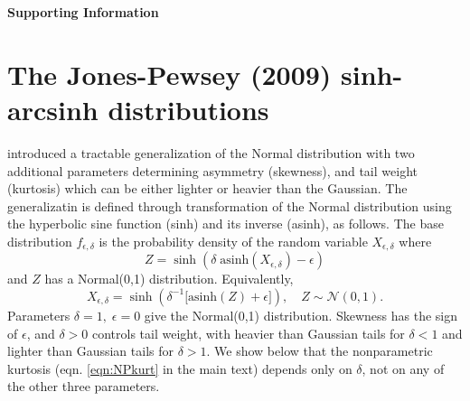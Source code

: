 \documentclass[12pt]{article}
\newcommand{\be}{\begin{equation}}
\newcommand{\ee}{\end{equation}}
\begin{document}
\newpage 
\clearpage 
\appendix

\renewcommand{\thetable}{S-\arabic{table}}
\renewcommand{\thefigure}{S-\arabic{figure}}
\renewcommand{\thesection}{S.\arabic{section}}
\renewcommand{\theequation}{S\arabic{equation}}

\setcounter{page}{1}
\setcounter{equation}{0}
\setcounter{figure}{0}
\setcounter{section}{0}
\setcounter{table}{0}

\begin{spacing}{1.35} 
	\linenumbers
	\centerline{\Large{\textbf{Supporting Information}}}
	
	\section{The Jones-Pewsey (2009) sinh-arcsinh distributions} 
	\label{sec:SHASHdist} 
	\citet{jones-pewsey-2009} introduced a tractable generalization of the Normal distribution with two 
	additional parameters determining asymmetry (skewness), and tail weight (kurtosis) which can be either 
	lighter or heavier than the Gaussian. The generalizatin is defined through transformation of the
	Normal distribution using the hyperbolic sine function (sinh) and its inverse (asinh), 
	as follows. The base distribution $f_{\epsilon,\delta}$  is the 
	probability density of the random variable $X_{\epsilon,\delta}$ where  
	\be
	Z = \sinh (\delta \; \mbox{asinh}(X_{\epsilon,\delta}) - \epsilon)
	\label{eqn:JP1}
	\ee
	and $Z$ has a Normal(0,1) distribution. Equivalently, 
	\be
	X_{\epsilon,\delta} = \sinh \left( \delta^{-1} \big[\mbox{asinh}(Z) + \epsilon \big] \right), \quad Z \sim \mathcal{N}(0,1).
	\label{eqn:JP2}
	\ee
	Parameters $\delta=1, \; \epsilon=0$ give the Normal(0,1) distribution. Skewness has the sign of $\epsilon$, and
	$\delta > 0$ controls tail weight, with heavier than Gaussian tails for $\delta<1$ and lighter than Gaussian tails for $\delta > 1$. We show below that the nonparametric kurtosis (eqn. \eqref{eqn:NPkurt} in the main text) depends 
	only on $\delta$, not on any of the other three parameters. 
	

\end{spacing}
\end{document}
